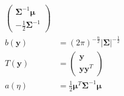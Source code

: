 \documentclass[a4paper]{article}
\begin{document}
\begin{enumerate}
\begin{equation*}
\begin{aligned}
    \begin{pmatrix}
      {\boldsymbol \Sigma}^{-1}\boldsymbol{\mu}\\
      -\frac{1}{2}{\boldsymbol \Sigma}^{-1}
    \end{pmatrix}\\
    b(\boldsymbol y) &= (2\pi)^{-\frac{n}{2}}|\boldsymbol \Sigma|^{-\frac{1}{2}}\\
    T(\boldsymbol y)&=
    \begin{pmatrix}
      \boldsymbol{y}\\
      \boldsymbol{y y}^T
    \end{pmatrix}\\
    a(\eta) &= \frac{1}{2} \boldsymbol{\mu}^T{\boldsymbol \Sigma}^{-1}\boldsymbol{\mu}
  \end{aligned}
\end{equation*}
\end{enumerate}
  
  
  
\end{document}
